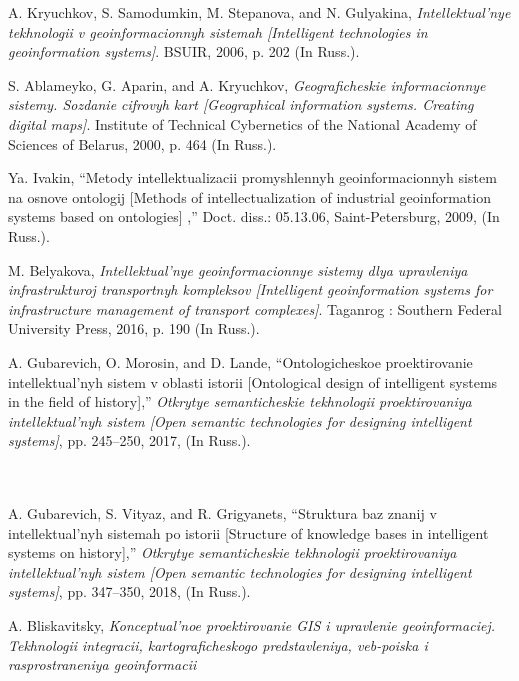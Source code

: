 \documentclass{article}
\begin{document}
\begin{multicols}{2}
\begin{itemize}
 \footnotesize{
  \renewcommand{\labelitemi}{[1]}
		\item A. Kryuchkov, S. Samodumkin, M. Stepanova, and N. Gulyakina,
 \textit{Intellektual’nye tekhnologii v geoinformacionnyh sistemah [Intelligent technologies in geoinformation systems]}. BSUIR, 2006, p.
202 (In Russ.).
\renewcommand{\labelitemi}{[2]}
		\item S. Ablameyko, G. Aparin, and A. Kryuchkov,  \textit{Geograficheskie
informacionnye sistemy. Sozdanie cifrovyh kart [Geographical
information systems. Creating digital maps]}. Institute of Technical
Cybernetics of the National Academy of Sciences of Belarus, 2000,
p. 464 (In Russ.).
\renewcommand{\labelitemi}{[3]}	
\item  Ya. Ivakin, “Metody intellektualizacii promyshlennyh
geoinformacionnyh sistem na osnove ontologij [Methods
of intellectualization of industrial geoinformation systems based
on ontologies] ,” Doct. diss.: 05.13.06, Saint-Petersburg, 2009,
(In Russ.).
\renewcommand{\labelitemi}{[4]}
\item M. Belyakova,  \textit{Intellektual’nye geoinformacionnye sistemy dlya
upravleniya infrastrukturoj transportnyh kompleksov [Intelligent
geoinformation systems for infrastructure management of transport
complexes]}. Taganrog : Southern Federal University Press, 2016,
p. 190 (In Russ.).
\renewcommand{\labelitemi}{[5]}
\item A. Gubarevich, O. Morosin, and D. Lande, “Ontologicheskoe
proektirovanie intellektual’nyh sistem v oblasti istorii [Ontological
design of intelligent systems in the field of history],”  \textit{Otkrytye
semanticheskie tekhnologii proektirovaniya intellektual’nyh sistem
[Open semantic technologies for designing intelligent systems]},
pp. 245–250, 2017, (In Russ.).\\
\ \ \ \\
\ \ \\ 
\renewcommand{\labelitemi}{[6]}
\item A. Gubarevich, S. Vityaz, and R. Grigyanets, “Struktura baz znanij
v intellektual’nyh sistemah po istorii [Structure of knowledge
bases in intelligent systems on history],”  \textit{Otkrytye semanticheskie
tekhnologii proektirovaniya intellektual’nyh sistem [Open semantic
technologies for designing intelligent systems]}, pp. 347–350, 2018,
(In Russ.).
\renewcommand{\labelitemi}{[7]}
\item A. Bliskavitsky,  \textit{Konceptual’noe proektirovanie GIS i upravlenie
geoinformaciej. Tekhnologii integracii, kartograficheskogo
predstavleniya, veb-poiska i rasprostraneniya geoinformacii
}}
\end{itemize}
\end{multicols}
\end{document}

